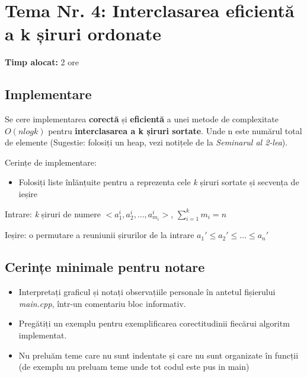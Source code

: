 \documentclass[../ro-fa-lab.tex]{subfiles}
\begin{document}
\section{\texorpdfstring{\textbf{Tema Nr. 4: Interclasarea eficientă a k șiruri ordonate}}{Tema Nr. 4: Interclasarea eficientă a k șiruri ordonate}}\label{assign4}

\textbf{Timp alocat:} 2 ore

\subsection{Implementare}\label{implementare}

Se cere implementarea \textbf{corectă} și \textbf{eficientă} a unei
metode de complexitate $O(n logk)$ pentru \textbf{interclasarea a k șiruri
sortate}. Unde n este numărul total de elemente (Sugestie: folosiți un
heap, vezi notițele de la \emph{Seminarul al 2-lea}).

Cerințe de implementare:

\begin{itemize}
\item
  Folosiți liste înlănțuite pentru a reprezenta cele \emph{k} șiruri
  sortate și secvența de ieșire
\end{itemize}

Intrare: \emph{k} șiruri de numere
\(< a_{1}^{i},a_{2}^{i},\ldots,a_{m_{i}}^{i} >\),
\(\sum_{i = 1}^{k}m_{i} = n\)

Ieșire: o permutare a reuniunii șirurilor de la intrare
\(a_{1}' \leq a_{2}' \leq \ldots \leq a_{n}'\)

\subsection{Cerințe minimale pentru
notare}\label{cerinux21be-minimale-pentru-notare}

\begin{itemize}
\item
  Interpretați graficul și notați observațiile personale în antetul
  fișierului \emph{main.cpp}, într-un comentariu bloc informativ.
\end{itemize}

\begin{itemize}
\item
  Pregătiți un exemplu pentru exemplificarea corectitudinii fiecărui
  algoritm implementat.
\item
  Nu preluăm teme care nu sunt indentate și care nu sunt organizate în
  funcții (de exemplu nu preluam teme unde tot codul este pus in main)
\end{itemize}
\end{document}
